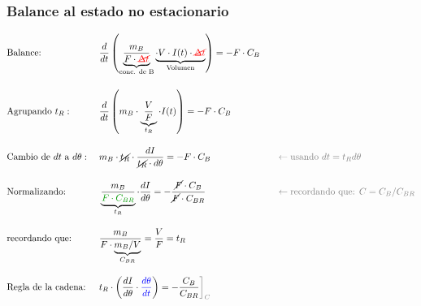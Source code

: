 \subsubsection{Balance al estado no estacionario}
\begin{alignat*}{3}
     & \text{Balance: }                         &  & \frac{d}{dt} \left( \underbrace{\frac{m_B}{F \cdot \textcolor{red}{\cancel{\Delta t}}}}_{\text{conc. de B}} \underbrace{ \cdot V \cdot I(t) \cdot \textcolor{red}{\cancel{\Delta t}} }_{\text{Volumen}} \right) = -F \cdot C_B &       &                                                                                                                \\[12pt]
     & \text{Agrupando } t_R:                   &  & \frac{d}{dt} \left( m_B \cdot \underbrace{\frac{V}{F}}_{t_R} \cdot I(t) \right) = -F \cdot C_B                                                                                                                                 &       &                                                                                                                \\[10pt]
     & \text{Cambio de } dt \text{ a } d\theta: &  & m_B \cdot \cancel{t_R} \cdot \frac{dI}{\cancel{t_R} \cdot d\theta} = -F \cdot C_B                                                                                                                                              & \quad & \textcolor{gray}{\leftarrow \text{usando } dt = t_R d\theta}                                                   \\[10pt]
     & \text{Normalizando: }                    &  & \underbrace{\frac{m_B}{ \textcolor{darkgreen}{F \cdot C_{BR}}}}_{t_R} \cdot \frac{dI}{d\theta} = -\frac{\cancel{F}\cdot C_B}{\cancel{F}\cdot C_{BR}}                                                                           & \quad & \textcolor{gray}{\leftarrow \text{recordando que: } C = C_B/C_{BR}}                                            \\[10pt]
     & \text{recordando que:}                   &  & \frac{m_B}                            {F\cdot \underbrace{m_B/V}_{C_{BR}}}      = \frac{V}{F} = t_R                                                                                                                            &       &                                                                                                                \\[10pt]
     & \text{Regla de la cadena: }              &  & t_R \cdot \left( \frac{dI}{d\theta} \cdot \textcolor{blue}{\frac{d\theta}{dt}} \right) = - \frac{C_B}{C_{BR}}\textcolor{gray}{\bigg]_C}                                                                                        &       &                                                                                                                \\[10pt]

\end{alignat*}
